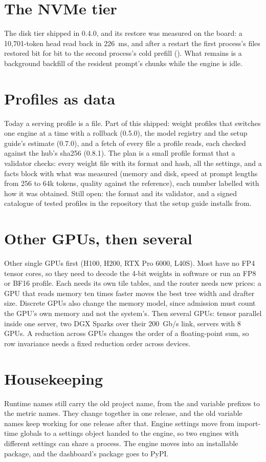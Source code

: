 \section{The NVMe tier}

The disk tier shipped in 0.4.0, and its restore was measured on the board: a 10,701-token head read back in 226~ms, and after a restart the first process's files restored bit for bit to the second process's cold prefill (\measured). What remains is a background backfill of the resident prompt's chunks while the engine is idle.

\section{Profiles as data}

Today a serving profile is a  file. Part of this shipped: weight profiles that  switches one engine at a time with a rollback (0.5.0), the model registry and the setup guide's estimate (0.7.0), and a fetch of every file a profile reads, each checked against the hub's sha256 (0.8.1). The plan is a small profile format that a validator checks: every weight file with its format and hash, all the settings, and a facts block with what was measured (memory and disk, speed at prompt lengths from 256 to 64k tokens, quality against the reference), each number labelled with how it was obtained. Still open: the format and its validator, and a signed catalogue of tested profiles in the repository that the setup guide installs from.

\section{Other GPUs, then several}

Other single GPUs first (H100, H200, RTX Pro 6000, L40S). Most have no FP4 tensor cores, so they need to decode the 4-bit weights in software or run an FP8 or BF16 profile. Each needs its own tile tables, and the router needs new prices: a GPU that reads memory ten times faster moves the best tree width and drafter size. Discrete GPUs also change the memory model, since admission must count the GPU's own memory and not the system's. Then several GPUs: tensor parallel inside one server, two DGX Sparks over their 200~Gb/s link, servers with 8 GPUs. A reduction across GPUs changes the order of a floating-point sum, so row invariance needs a fixed reduction order across devices.

\section{Housekeeping}

Runtime names still carry the old project name, from the  and  variable prefixes to the metric names. They change together in one release, and the old variable names keep working for one release after that. Engine settings move from import-time globals to a settings object handed to the engine, so two engines with different settings can share a process. The engine moves into an installable package, and the dashboard's package goes to PyPI.

